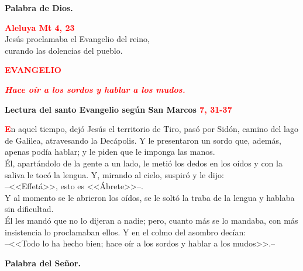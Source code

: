 \documentclass[12pt, letterpaper]{report}
\begin{document}
{\bfseries Palabra de Dios.}

\newpage

\begin{center}
\Large {\bfseries \textcolor{red}{Aleluya \hspace{1cm} Mt 4, 23}}\\
Jes\'us proclamaba el Evangelio del reino,\\
curando las dolencias del pueblo.
\end{center}

\begin{center}
\Large {\bfseries \textcolor{red}{EVANGELIO}}
\end{center}

\begin{center}
\large {\bfseries \textit{ \textcolor{red}{Hace o\'ir a los sordos y hablar a los mudos.}}}
\end{center}

\Huge \textcolor{red}{} \Large {\bfseries Lectura del santo Evangelio seg\'un San Marcos \hspace{1cm} \textcolor{red}{7, 31-37}}

\lettrine[lines=2]{\bfseries \textcolor{red}{E}}{}\Large n aquel tiempo, dej\'o Jes\'us el territorio de Tiro, pas\'o por Sid\'on, camino del lago de Galilea, atravesando la Dec\'apolis. Y le presentaron un sordo que, adem\'as, apenas pod\'ia hablar; y le piden que le imponga las manos.\\
\'El, apart\'andolo de la gente a un lado, le meti\'o los dedos en los o\'idos y con la saliva le toc\'o la lengua. Y, mirando al cielo, suspir\'o y le dijo:\\
--<<Effet\'a>>, esto es <<\'Abrete>>--.\\
Y al momento se le abrieron los o\'idos, se le solt\'o la traba de la lengua y hablaba sin dificultad.\\
\'El les mand\'o que no lo dijeran a nadie; pero, cuanto m\'as se lo mandaba, con m\'as insistencia lo proclamaban ellos. Y en el colmo del asombro dec\'ian:\\
--<<Todo lo ha hecho bien; hace o\'ir a los sordos y hablar a los mudos>>.--

{\bfseries Palabra del Se\~nor.}
\end{document}
